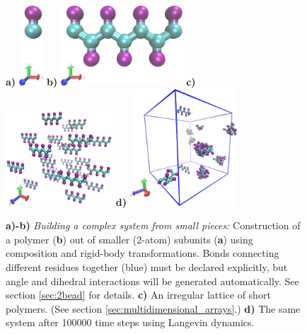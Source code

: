 \documentclass[11pt]{article}
\begin{document}
\begin{figure}[htbp]
\centering
\textbf{a)}
\includegraphics[height=3cm]{2bead_residue.jpg}
\quad \quad \quad \quad \quad
\textbf{b)}
\includegraphics[height=3cm]{2bead_peptide.jpg}
\newline
\vspace{10 mm}
\newline
\textbf{c)}
\includegraphics[width=4cm]{2bead_peptides_nopbc_t=0_LR.jpg}
\textbf{d)}
\includegraphics[width=4cm]{2bead_peptides_t=100ps_LR.jpg}
\caption{
\label{fig:2bead_peptide}
\textbf{a)-b)}
\textit{Building a complex system from small pieces:}
Construction of a polymer (\textbf{b}) 
out of smaller (2-atom) subunits (\textbf{a})
using composition and rigid-body transformations. 
Bonds connecting different residues together (blue) 
must be declared explicitly, 
but angle and dihedral interactions will be generated automatically.
See section \ref{sec:2bead} for details.
\textbf{c)}
An irregular lattice of short polymers.
(See section \ref{sec:multidimensional_arrays}.)
\textbf{d)}
The same system after 100000 time steps using Langevin dynamics.
}
\end{figure}
\end{document}
